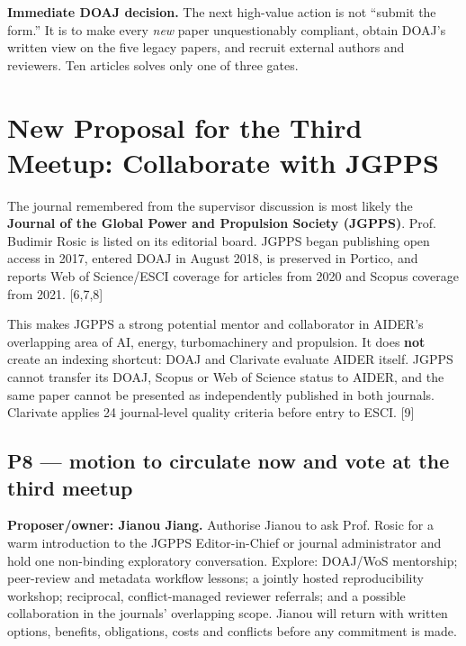 \documentclass[11pt]{article}
\newcommand{\src}[1]{{\footnotesize\color{ink3}[#1]}}
\begin{document}
\begin{solvebox}
\textbf{Immediate DOAJ decision.} The next high-value action is not ``submit the form.'' It is to make every \emph{new} paper unquestionably compliant, obtain DOAJ's written view on the five legacy papers, and recruit external authors and reviewers. Ten articles solves only one of three gates.
\end{solvebox}

\section{New Proposal for the Third Meetup: Collaborate with JGPPS}

The journal remembered from the supervisor discussion is most likely the \textbf{Journal of the Global Power and Propulsion Society (JGPPS)}. Prof. Budimir Rosic is listed on its editorial board. JGPPS began publishing open access in 2017, entered DOAJ in August 2018, is preserved in Portico, and reports Web of Science/ESCI coverage for articles from 2020 and Scopus coverage from 2021. \src{6,7,8}

This makes JGPPS a strong potential mentor and collaborator in AIDER's overlapping area of AI, energy, turbomachinery and propulsion. It does \textbf{not} create an indexing shortcut: DOAJ and Clarivate evaluate AIDER itself. JGPPS cannot transfer its DOAJ, Scopus or Web of Science status to AIDER, and the same paper cannot be presented as independently published in both journals. Clarivate applies 24 journal-level quality criteria before entry to ESCI. \src{9}

\subsection*{P8 --- motion to circulate now and vote at the third meetup}

\begin{takeaway}
\textbf{Proposer/owner: Jianou Jiang.} Authorise Jianou to ask Prof. Rosic for a warm introduction to the JGPPS Editor-in-Chief or journal administrator and hold one non-binding exploratory conversation. Explore: DOAJ/WoS mentorship; peer-review and metadata workflow lessons; a jointly hosted reproducibility workshop; reciprocal, conflict-managed reviewer referrals; and a possible collaboration in the journals' overlapping scope. Jianou will return with written options, benefits, obligations, costs and conflicts before any commitment is made.
\end{takeaway}
\end{document}
